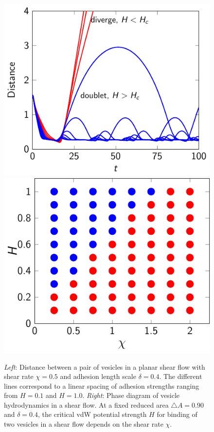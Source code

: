 \documentclass[prf,superscriptaddress,showpacs]{revtex4-1}
\begin{document}
\begin{figure}
  \includegraphics[height=0.4\textwidth]{figs/shear_adR4em1Chi1e0_ra-090.pdf}
  \includegraphics[height=0.4\textwidth]{figs/shear_adR4em1_ra090_phaseDiagram.pdf}
  \caption{{\em Left}: Distance between a pair of vesicles in a planar
  shear flow with shear rate $\chi=0.5$ and adhesion length scale
  $\delta = 0.4$.   The different lines correspond to a linear spacing
  of adhesion strengths ranging from $H=0.1$ and $H=1.0$.  {\em Right}:
  Phase diagram of vesicle hydrodynamics in a shear flow.  At a fixed
  reduced area $\triangle A=0.90$ and $\delta =0.4$,  the critical vdW
  potential strength $H$ for binding of two vesicles in a shear flow
  depends on the shear rate $\chi$.
\label{fig:sflow_phase_diagram}}
\end{figure}

\end{document}
